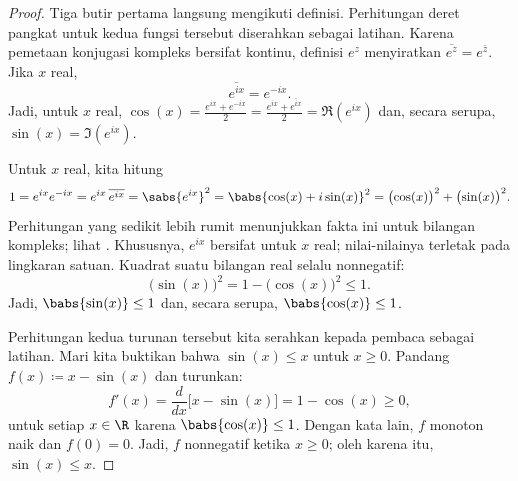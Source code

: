 \begin{proof}
Tiga butir pertama langsung mengikuti definisi.
Perhitungan deret pangkat untuk kedua fungsi tersebut diserahkan sebagai latihan.
Karena pemetaan konjugasi kompleks bersifat kontinu, definisi
$e^z$ menyiratkan
$\overline{e^z} = e^{\bar{z}}$. Jika
$x$ real,
\begin{equation*}
\overline{e^{ix}} = e^{-ix} .
\end{equation*}
Jadi, untuk $x$ real,
$\cos(x) =
\frac{e^{ix}+e^{-ix}}{2} =
\frac{e^{ix}+\overline{e^{ix}}}{2} =
\Re (e^{ix})$
dan, secara serupa, $\sin(x) = \Im (e^{ix})$.

Untuk $x$ real, kita hitung
\begin{equation*}
1 =  e^{ix} e^{-ix}
= e^{ix} \, \overline{e^{ix}}
= \sabs{e^{ix}}^2
= \babs{\cos(x) + i \sin(x)}^2
= {\bigl( \cos(x) \bigr)}^2 + {\bigl( \sin(x) \bigr)}^2 .
\end{equation*}
Perhitungan yang sedikit lebih rumit menunjukkan fakta ini untuk
bilangan kompleks; lihat .
Khususnya, $e^{ix}$ bersifat \emph{} untuk $x$ real;
nilai-nilainya terletak pada lingkaran satuan.
Kuadrat suatu bilangan real selalu nonnegatif:
\begin{equation*}
{\bigl(\sin(x)\bigr)}^2 = 1-{\bigl(\cos(x)\bigr)}^2 \leq 1 .
\end{equation*}
Jadi, $\babs{\sin(x)} \leq 1$ dan, secara serupa,
$\babs{\cos(x)} \leq 1$.

Perhitungan kedua turunan tersebut kita serahkan kepada pembaca sebagai latihan.
Mari kita buktikan bahwa $\sin(x) \leq x$ untuk $x \geq 0$.
Pandang
$f(x) \coloneqq x-\sin(x)$ dan turunkan:
\begin{equation*}
f'(x) = \frac{d}{dx} \bigl[ x - \sin(x) \bigr]
=
1 -\cos(x) \geq 0 ,
\end{equation*}
untuk setiap $x \in \R$ karena $\babs{\cos(x)} \leq 1$.
Dengan kata lain, $f$ monoton naik dan $f(0) = 0$.
Jadi, $f$ nonnegatif ketika $x \geq 0$; oleh karena itu, $\sin(x) \leq x$.


\end{proof}
